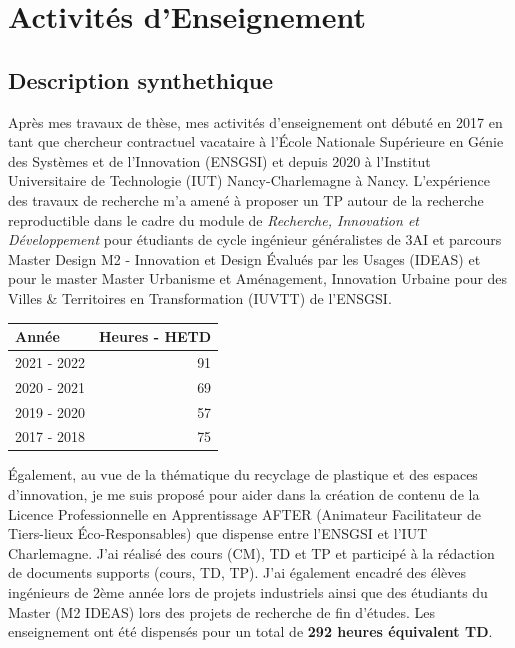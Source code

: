 \documentclass[
  12pt,
  oneside]{book}
\begin{document}
\hypertarget{activituxe9s-denseignement}{%
\chapter{Activités d'Enseignement}\label{activituxe9s-denseignement}}

\hypertarget{description-synthethique}{%
\section{Description synthethique}\label{description-synthethique}}

Après mes travaux de thèse, mes activités d'enseignement ont débuté en 2017 en tant que chercheur contractuel vacataire à l'École Nationale Supérieure en Génie des Systèmes et de l'Innovation (ENSGSI) et depuis 2020 à l'Institut Universitaire de Technologie (IUT) Nancy-Charlemagne à Nancy.
L'expérience des travaux de recherche m'a amené à proposer un TP autour de la recherche reproductible dans le cadre du module de \emph{Recherche, Innovation et Développement} pour étudiants de cycle ingénieur généralistes de 3AI et parcours Master Design M2 - Innovation et Design Évalués par les Usages (IDEAS) et pour le master Master Urbanisme et Aménagement, Innovation Urbaine pour des Villes \& Territoires en Transformation (IUVTT) de l'ENSGSI.

\begin{table}
\centering
\begin{tabular}[t]{lr}
\toprule
Année & Heures - HETD\\
\midrule
2021 - 2022 & 91\\
2020 - 2021 & 69\\
2019 - 2020 & 57\\
2017 - 2018 & 75\\
\bottomrule
\end{tabular}
\end{table}

Également, au vue de la thématique du recyclage de plastique et des espaces d'innovation, je me suis proposé pour aider dans la création de contenu de la Licence Professionnelle en Apprentissage AFTER (Animateur Facilitateur de Tiers-lieux Éco-Responsables) que dispense entre l'ENSGSI et l'IUT Charlemagne. J'ai réalisé des cours (CM), TD et TP et participé à la rédaction de documents supports (cours, TD, TP). J'ai également encadré des élèves ingénieurs de 2ème année lors de projets industriels ainsi que des étudiants du Master (M2 IDEAS) lors des projets de recherche de fin d'études. Les enseignement ont été dispensés pour un total de \textbf{292 heures équivalent TD}.
\end{document}
